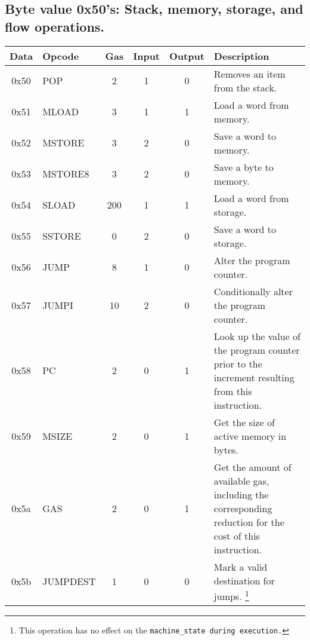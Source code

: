 \documentclass[10pt,a4paper,leqno,bibliography=totoc]{scrartcl}
\newenvironment{alphafootnotes}
{\par\edef\savedfootnotenumber{\number\value{footnote}}
\renewcommand{\thefootnote}{\alph{footnote}}
\setcounter{footnote}{0}}
{\par\setcounter{footnote}{\savedfootnotenumber}}
\begin{document}
\begin{alphafootnotes}
		\subsection{Byte value 0x50's: Stack, memory, storage, and flow operations.}
			\begin{longtable}{|cP{2.8cm}cccp{6cm}|}
			\hline
			\textbf{Data} & \textbf{Opcode} & \textbf{Gas}  & \textbf{Input}  & \textbf{Output} & \textbf{Description} \\
			\hline
			0x50 & POP & 2 & 1 & 0 & Removes an item from the stack. \\
			0x51 & MLOAD & 3 & 1 & 1 & Load a word from memory. \\
			0x52 & MSTORE & 3 & 2 & 0 & Save a word to memory. \\
			0x53 & MSTORE8 & 3 & 2 & 0 & Save a byte to memory. \\
			0x54 & SLOAD & 200 & 1 & 1 & Load a word from storage. \\
			0x55 & SSTORE & 0 & 2 & 0 & Save a word to storage.\\
			0x56 & JUMP & 8 & 1 & 0 & Alter the program counter. \\
			0x57 & JUMPI & 10 & 2 & 0 & Conditionally alter the program counter. \\
			0x58 & PC & 2 & 0 & 1 & Look up the value of the program counter prior to the increment resulting from this instruction. \\
			0x59 & MSIZE & 2 & 0 & 1 & Get the size of active memory in bytes. \\
			0x5a & GAS & 2 & 0 & 1 & Get the amount of available gas, including the corresponding reduction for the cost of this instruction. \\
			0x5b & JUMPDEST & 1 & 0 & 0 & Mark a valid destination for jumps. \footnote{This operation has no effect on the \texttt{machine\_state during execution.}} \\
			\hline
			\end{longtable}


\end{alphafootnotes}
\end{document}
